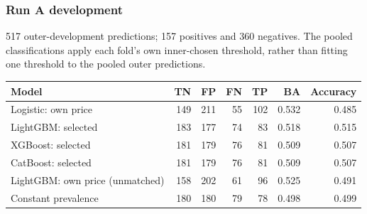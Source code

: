 
\subsubsection*{Run A development}
517 outer-development predictions; 157 positives and 360 negatives. The pooled classifications apply each fold's own inner-chosen threshold, rather than fitting one threshold to the pooled outer predictions.
\begingroup\small\setlength{\tabcolsep}{3pt}
\begin{longtable}{@{}p{.35\linewidth}rrrrrr@{}}
\toprule Model & TN & FP & FN & TP & BA & Accuracy\\\midrule\endhead
Logistic: own price & 149 & 211 & 55 & 102 & 0.532 & 0.485\\
LightGBM: selected & 183 & 177 & 74 & 83 & 0.518 & 0.515\\
XGBoost: selected & 181 & 179 & 76 & 81 & 0.509 & 0.507\\
CatBoost: selected & 181 & 179 & 76 & 81 & 0.509 & 0.507\\
LightGBM: own price (unmatched) & 158 & 202 & 61 & 96 & 0.525 & 0.491\\
Constant prevalence & 180 & 180 & 79 & 78 & 0.498 & 0.499\\
\bottomrule\end{longtable}\endgroup
\begingroup\small\setlength{\tabcolsep}{3pt}
